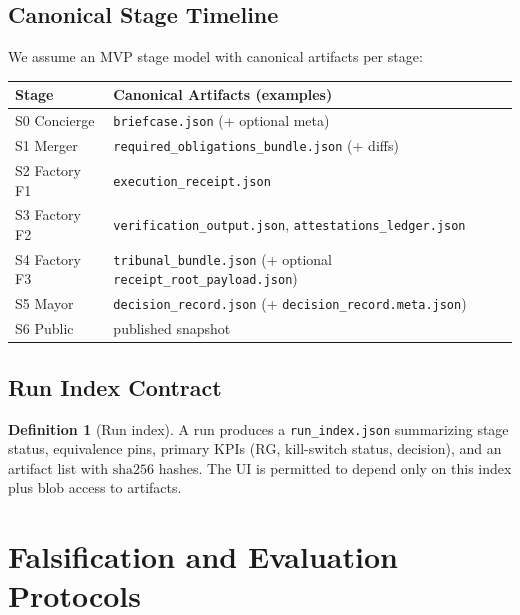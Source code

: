 \documentclass[11pt,a4paper]{article}
\theoremstyle{plain}
\theoremstyle{definition}
\newtheorem{definition}[theorem]{Definition}
\theoremstyle{remark}
\newcommand{\sha}{\mathrm{sha256}}
\newcommand{\RG}{\mathrm{RG}}
\begin{document}
\subsection{Canonical Stage Timeline}
We assume an MVP stage model with canonical artifacts per stage:
\begin{center}
\begin{tabular}{@{}ll@{}}
\toprule
Stage & Canonical Artifacts (examples) \\
\midrule
S0 Concierge & \texttt{briefcase.json} (+ optional meta) \\
S1 Merger & \texttt{required\_obligations\_bundle.json} (+ diffs) \\
S2 Factory F1 & \texttt{execution\_receipt.json} \\
S3 Factory F2 & \texttt{verification\_output.json}, \texttt{attestations\_ledger.json} \\
S4 Factory F3 & \texttt{tribunal\_bundle.json} (+ optional \texttt{receipt\_root\_payload.json}) \\
S5 Mayor & \texttt{decision\_record.json} (+ \texttt{decision\_record.meta.json}) \\
S6 Public & published snapshot \\
\bottomrule
\end{tabular}
\end{center}

\subsection{Run Index Contract}
\begin{definition}[Run index]
A run produces a \texttt{run\_index.json} summarizing stage status, equivalence pins, primary KPIs (\(\RG\), kill-switch status, decision), and an artifact list with \(\sha\) hashes. The UI is permitted to depend only on this index plus blob access to artifacts.
\end{definition}

\section{Falsification and Evaluation Protocols}
\end{document}
